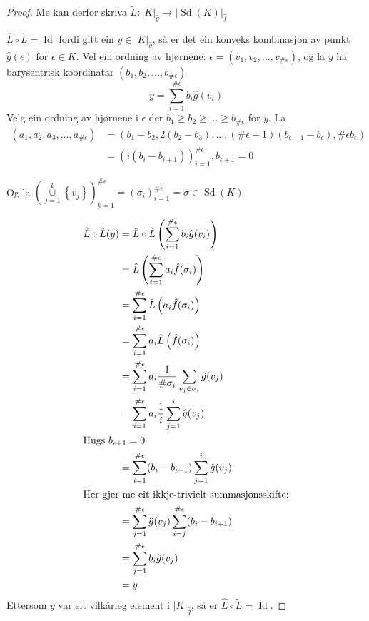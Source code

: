 \documentclass[a4paper, 12pt, norsk]{article}
\theoremstyle{plain}
\theoremstyle{definition}
\newcommand{\union}{ \mathop{\cup}\limits }
\newcommand{\gr}[1]{ \lvert #1 \rvert } %
\newcommand{\set}[1]{ \left \{ #1 \right \} } %
\newcommand{\tuple}[1]{ \left( #1 \right) } %
\DeclareMathOperator{\Sd}{Sd}
\DeclareMathOperator{\Id}{Id}
\begin{document}
\begin{proof}
	Me kan derfor skriva \( \tilde{L}: \gr{K}_{\hat{g}} \to \gr{\Sd(K)}_{\hat{f}} \)

	\( \hat{L}\circ\tilde{L} = \Id \) fordi gitt ein \( y \in \gr{K}_{\hat{g}} \), så er det ein konveks kombinasjon av punkt \( \hat{g}(\epsilon) \) for \( \epsilon \in K \). Vel ein ordning av hjørnene: \( \epsilon = (v_1, v_2, \dots, v_{\#\epsilon}) \), og la \( y \) ha barysentrisk koordinatar \( (b_1, b_2, \dots, b_{\#\epsilon}) \)
	\[
		y = \sum_{i = 1}^{\#\epsilon} b_i \hat{g}(v_i)
	\]
	Velg ein ordning av hjørnene i \( \epsilon \) der \( b_1 \geq b_2 \geq \dots \geq b_{\#\epsilon} \) for \( y \). La 
	\begin{align*}
		(a_1, a_2, a_3, \dots, a_{\#\epsilon}) &= \left( b_1-b_2, 2(b_2-b_3), \dots, (\#\epsilon-1)(b_{\epsilon-1}-b_{\epsilon}), \#\epsilon b_{\epsilon} \right) \\
		&= \left( i (b_i-b_{i+1}) \right)_{i=1}^{\#\epsilon}, b_{\epsilon+1} = 0
	\end{align*}
		
	Og la \( \left(\union_{j = 1}^{k} \set{v_j} \right)_{k=1}^{\#\epsilon} = (\sigma_i)_{i=1}^{\#\epsilon}=\sigma \in \Sd(K) \)
	
	\begin{align*} %
		\hat{L}\circ\tilde{L}(y) &= \hat{L}\circ\tilde{L}\tuple{\sum_{i=1}^{\#\epsilon} b_i \hat{g}(v_i)} \\
		&= \hat{L}\left( \sum_{i=1}^{\#\epsilon} a_i \hat{f}(\sigma_i) \right) \\
		&= \sum_{i=1}^{\#\epsilon} \hat{L} \left( a_i \hat{f}(\sigma_i) \right) \\
		&= \sum_{i=1}^{\#\epsilon} a_i \hat{L} \left( \hat{f}(\sigma_i) \right) \\
		&= \sum_{i=1}^{\#\epsilon} a_i \frac{1}{\#\sigma_i} \sum_{v_j \in \sigma_i} \hat{g}(v_j) \\
		&= \sum_{i=1}^{\#\epsilon} a_i \frac{1}{i} \sum_{j = 1}^{i} \hat{g}(v_j) \\
		\intertext{Hugs \( b_{\epsilon+1} = 0 \)}
		&= \sum_{i=1}^{\#\epsilon} (b_{i}-b_{i+1}) \sum_{j = 1}^{i} \hat{g}(v_j) \\
		\intertext{Her gjer me eit ikkje-trivielt summasjonsskifte:}
		&= \sum_{j=1}^{\#\epsilon} \hat{g}(v_j) \sum_{i = j}^{\#\epsilon} (b_{i}-b_{i+1}) \\
		&= \sum_{j=1}^{\#\epsilon} b_i \hat{g}(v_j) \\
		&= y
	\end{align*}
	Ettersom \( y \) var eit vilkårleg element i \( \gr{K}_{\hat{g}} \), så er \( \hat{L}\circ\tilde{L} = \Id \).


\end{proof}
\end{document}
